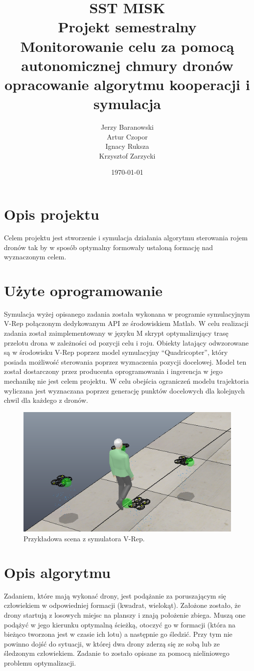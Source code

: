 \documentclass[a4paper, 11pt, oneside]{article}
\title{%
  SST MISK \\Projekt semestralny \\
  \vspace{5mm}
  \large Monitorowanie celu za pomocą autonomicznej chmury dronów\\
  opracowanie algorytmu kooperacji i symulacja}
\author{Jerzy Baranowski\\Artur Czopor\\Ignacy Ruksza \\Krzysztof Zarzycki }
\date{\today}
\begin{document}
\maketitle
\newpage
\section{Opis projektu}
Celem projektu jest stworzenie i symulacja działania algorytmu sterowania rojem dronów tak by w sposób optymalny formowały ustaloną formację nad wyznaczonym celem. 
\section{Użyte oprogramowanie}

Symulacja wyżej opisanego zadania została wykonana w programie symulacyjnym V-Rep połączonym dedykowanym API ze środowiskiem Matlab. W celu realizacji zadania został zaimplementowany w języku M skrypt optymalizujący trasę przelotu drona w zależności od pozycji celu i roju.  Obiekty latający odwzorowane są w środowisku V-Rep poprzez model symulacyjny “Quadricopter”, który posiada możliwość sterowania poprzez wyznaczenia pozycji docelowej. Model ten został dostarczony przez producenta oprogramowania i ingerencja w jego mechanikę nie jest celem projektu. W celu obejścia ograniczeń modelu trajektoria wyliczana jest wyznaczana poprzez generację punktów docelowych dla kolejnych chwil dla każdego z dronów.

\begin{figure}[H]
\centering
\includegraphics[scale=0.5]{simulation1.png}
\caption{Przykładowa scena z symulatora V-Rep.}

\end{figure}

\section{Opis algorytmu}
Zadaniem, które mają wykonać drony, jest podążanie za poruszającym się człowiekiem w odpowiedniej formacji (kwadrat, wielokąt). Założone zostało, że drony startują z losowych miejsc na planszy i znają położenie zbiega. Muszą one podążyć w jego kierunku optymalną ścieżką, otoczyć go w formacji (która na bieżąco tworzona jest w czasie ich lotu) a następnie go śledzić. Przy tym nie powinno dojść do sytuacji, w której dwa drony zderzą się ze sobą lub ze śledzonym człowiekiem. Zadanie to zostało opisane za pomocą nieliniowego problemu optymalizacji.
\end{document}
